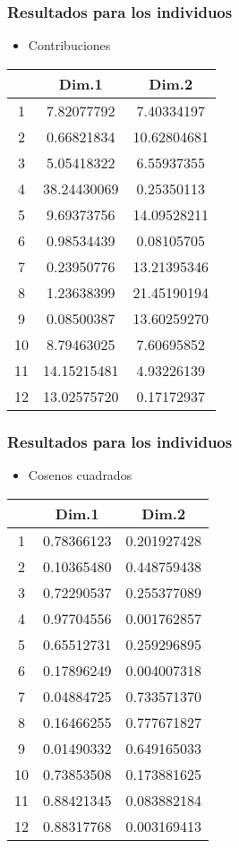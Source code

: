\documentclass[12pt]{beamer}
\begin{document}
\begin{frame}
\frametitle{Resultados para los individuos}
\begin{itemize}
\item Contribuciones
\end{itemize}
\begin{center}
\begin{tabular}{|c|c|c|}
\hline
 & Dim.1  &     Dim.2 \\
\hline
1 &  7.82077792&  7.40334197 \\
2 &  0.66821834& 10.62804681\\
3 &  5.05418322&  6.55937355\\
4 & 38.24430069&  0.25350113\\
5 &  9.69373756& 14.09528211\\
6 &  0.98534439&  0.08105705\\
7 &  0.23950776& 13.21395346\\
8 &  1.23638399& 21.45190194\\
9 &  0.08500387& 13.60259270\\
10 & 8.79463025&  7.60695852\\
11 &14.15215481&  4.93226139\\
12 &13.02575720&  0.17172937\\
\hline
\end{tabular}
\end{center}
\end{frame}

\begin{frame}
\frametitle{Resultados para los individuos}
\begin{itemize}
\item Cosenos cuadrados
\end{itemize}
\begin{center}
\begin{tabular}{|c|c|c|}
\hline
 & Dim.1  &     Dim.2 \\
\hline
1 & 0.78366123& 0.201927428 \\
2 & 0.10365480& 0.448759438\\
3 & 0.72290537& 0.255377089\\
4 & 0.97704556& 0.001762857\\
5 & 0.65512731& 0.259296895\\
6 & 0.17896249& 0.004007318\\
7 & 0.04884725& 0.733571370\\
8 & 0.16466255& 0.777671827\\
9 & 0.01490332& 0.649165033\\
10& 0.73853508& 0.173881625\\
11& 0.88421345& 0.083882184\\
12& 0.88317768& 0.003169413\\
\hline
\end{tabular}
\end{center}
\end{frame}
\end{document}
